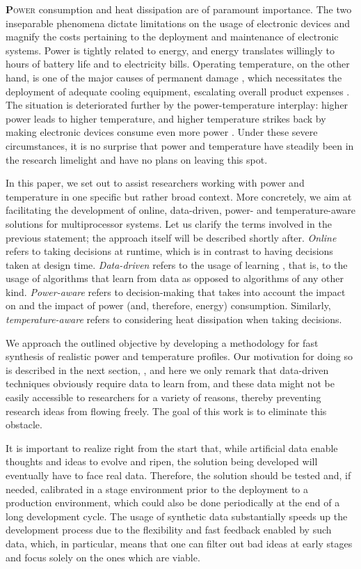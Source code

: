 \lettrine[findent=0.4em, nindent=0em]{\textbf{P}}{ower} consumption and heat
dissipation are of paramount importance. The two inseparable phenomena dictate
limitations on the usage of electronic devices and magnify the costs pertaining
to the deployment and maintenance of electronic systems. Power is tightly
related to energy, and energy translates willingly to hours of battery life and
to electricity bills. Operating temperature, on the other hand, is one of the
major causes of permanent damage \cite{jedec}, which necessitates the deployment
of adequate cooling equipment, escalating overall product expenses
\cite{chaudhry2015}. The situation is deteriorated further by the
power-temperature interplay: higher power leads to higher temperature, and
higher temperature strikes back by making electronic devices consume even more
power \cite{liu2007}. Under these severe circumstances, it is no surprise that
power and temperature have steadily been in the research limelight and have no
plans on leaving this spot.

In this paper, we set out to assist researchers working with power and
temperature in one specific but rather broad context. More concretely, we aim at
facilitating the development of online, data-driven, power- and
temperature-aware solutions for multiprocessor systems. Let us clarify the terms
involved in the previous statement; the approach itself will be described
shortly after. \emph{Online} refers to taking decisions at runtime, which is in
contrast to having decisions taken at design time. \emph{Data-driven} refers to
the usage of learning \cite{bishop2006}, that is, to the usage of algorithms
that learn from data as opposed to algorithms of any other kind.
\emph{Power-aware} refers to decision-making that takes into account the impact
on and the impact of power (and, therefore, energy) consumption. Similarly,
\emph{temperature-aware} refers to considering heat dissipation when taking
decisions.

We approach the outlined objective by developing a methodology for fast
synthesis of realistic power and temperature profiles. Our motivation for doing
so is described in the next section, , and here we only remark
that data-driven techniques obviously require data to learn from, and these data
might not be easily accessible to researchers for a variety of reasons, thereby
preventing research ideas from flowing freely. The goal of this work is to
eliminate this obstacle.

It is important to realize right from the start that, while artificial data
enable thoughts and ideas to evolve and ripen, the solution being developed will
eventually have to face real data. Therefore, the solution should be tested and,
if needed, calibrated in a stage environment prior to the deployment to a
production environment, which could also be done periodically at the end of a
long development cycle. The usage of synthetic data substantially speeds up the
development process due to the flexibility and fast feedback enabled by such
data, which, in particular, means that one can filter out bad ideas at early
stages and focus solely on the ones which are viable.

